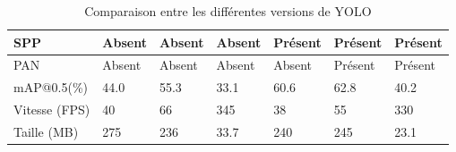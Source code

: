 \begin{itemize}
\begin{table}[H]
\begin{tabular}{|l|l|l|l|l|l|l|}
                    SPP & Absent & Absent & Absent & Présent & Présent & Présent \\ \hline
                    PAN & Absent & Absent & Absent & Absent & Présent & Présent \\ \hline
                    mAP@0.5(\%) & 44.0 & 55.3 & 33.1 & 60.6 & 62.8 & 40.2 \\ \hline
                    Vitesse (FPS) & 40 & 66 & 345 & 38 & 55 & 330 \\ \hline
                    Taille (MB) & 275 & 236 & 33.7 & 240 & 245 & 23.1 \\ \hline
                \end{tabular}
                \caption{Comparaison entre les différentes versions de YOLO}
                \label{table:yolo}
            \end{table}
            
        \end{itemize}
